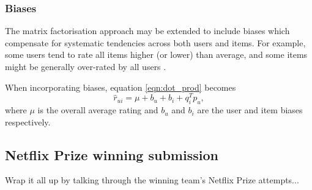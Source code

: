 \subsubsection{Biases}
The matrix factorisation approach may be extended to include biases which compensate for systematic tendencies across both users and items. For example, some users tend to rate all items higher (or lower) than average, and some items might be generally over-rated by all users \parencite{koren2009matrix}.

When incorporating biases, equation \ref{eqn:dot_prod} becomes
\begin{equation}
    \hat{r}_{ui} = \mu + b_u + b_i + q_i^T p_u,
\label{eqn:dot_bias}
\end{equation}
where $\mu$ is the overall average rating and $b_u$ and $b_i$ are the user and item biases respectively.

\subsection{Netflix Prize winning submission}
Wrap it all up by talking through the winning team's Netflix Prize attempts...